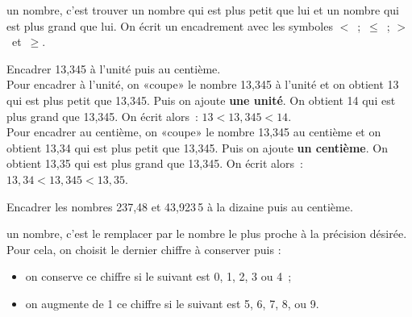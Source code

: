 \begin{methode*1}[Encadrer]

\begin{aconnaitre}
\textbf{} un nombre, c'est trouver un nombre qui est plus petit que lui et un nombre qui est plus grand que lui. On écrit un encadrement avec les symboles $<$ ; $\leqslant$ ; $>$ et $\geqslant$. 
\end{aconnaitre}

\begin{exemple*1}
Encadrer 13,345 à l'unité puis au centième.\\[0.5em]
Pour encadrer à l'unité, on «coupe» le nombre 13,345 à l'unité et on obtient 13 qui est plus petit  que 13,345. Puis on ajoute \textbf{une unité}. On obtient 14 qui est plus grand que 13,345. On écrit alors : $13 < 13,345 < 14$. \\[1em]
Pour encadrer au centième, on «coupe» le nombre 13,345 au centième et on obtient 13,34 qui est plus petit que 13,345. Puis on ajoute \textbf{un centième}. On obtient 13,35 qui est plus grand que 13,345. On écrit alors : $13,34 < 13,345 < 13,35$.
\end{exemple*1}

\exercice
Encadrer les nombres 237,48 et 43,923\,5 à la dizaine puis au centième.

\end{methode*1}


\begin{methode*1}[Arrondir]

\begin{aconnaitre}
\textbf{} un nombre, c’est le remplacer par le nombre le plus proche à la précision désirée. Pour cela, on choisit le dernier chiffre à conserver puis :
\begin{itemize}
 \item on conserve ce chiffre si le suivant est 0, 1, 2, 3 ou 4 ;
 \item on augmente de 1 ce chiffre si le suivant est 5, 6, 7, 8, ou 9.
 \end{itemize}
\end{aconnaitre}

\exercice


\end{methode*1}

